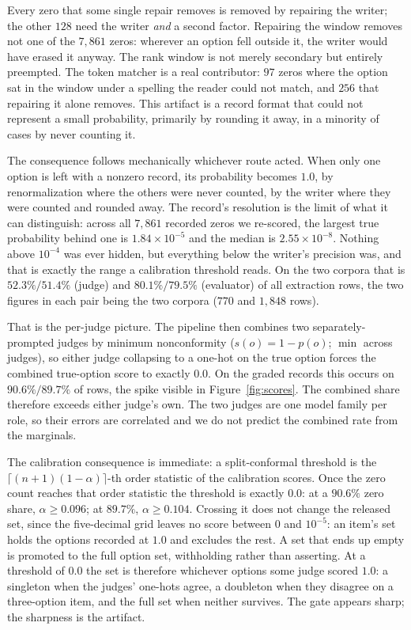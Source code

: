 \documentclass{article}
\newif\ifclaimtags\claimtagsfalse
\newcommand{\ct}[1]{\ifclaimtags\hfill{\scriptsize\textcolor{gray}{[#1]}}\fi}
\begin{document}
\noindent Every zero that some single repair removes is removed
by repairing the writer; the other $128$ need the writer \emph{and} a second
factor. Repairing the window removes not one of the $7{,}861$ zeros:
wherever an option fell outside it, the writer would have erased it anyway. The
rank window is not merely secondary but entirely preempted. The token matcher
is a real contributor: $97$
zeros where the option sat in the window under a spelling the reader could not
match, and $256$ that repairing it alone removes. This artifact is a record
format that could not represent a small probability, primarily by rounding it away, in a minority of cases by never counting it.\ct{C62, C69}

The consequence follows mechanically whichever route acted. When only one option is left
with a nonzero record, its probability becomes $1.0$, by renormalization where the others were never counted, by the writer where they were counted and rounded
away. The
record's resolution is the limit of what it can distinguish: across all $7{,}861$
recorded zeros we re-scored, the largest true probability behind one is
$1.84\times10^{-5}$ and the median is $2.55\times10^{-8}$. Nothing above $10^{-4}$ was ever hidden, but everything below the writer's precision was, and
that is exactly the range a calibration threshold reads.\ct{C67} On the two corpora that is
$52.3\%/51.4\%$ (judge) and $80.1\%/79.5\%$ (evaluator) of all extraction rows,
the two figures in each pair being the two corpora ($770$ and
$1{,}848$ rows).\ct{C1--C2, C62}

That is the per-judge picture. The pipeline then combines two separately-prompted
judges by minimum nonconformity ($s(o) = 1-p(o)$; $\min$ across judges), so
either judge collapsing to a one-hot on the true option forces the combined
true-option score to exactly $0.0$. On the graded records this occurs on $90.6\%/89.7\%$ of
rows, the spike visible in Figure~\ref{fig:scores}.\ct{C3} The combined share therefore exceeds either judge's own. The two judges are one model family per role, so their errors are correlated
and we do not predict the combined rate from the marginals.\ct{C52}

The calibration consequence is immediate: a split-conformal threshold is the
$\lceil(n{+}1)(1{-}\alpha)\rceil$-th order statistic of the calibration scores.
Once the zero count reaches that order statistic the threshold is exactly $0.0$: at a $90.6\%$ zero share, $\alpha \ge 0.096$; at $89.7\%$, $\alpha \ge
0.104$. Crossing it does not change the released set, since the five-decimal grid
leaves no score between $0$ and $10^{-5}$: an item's set holds
the options recorded at $1.0$ and excludes the rest.\ct{C4} A set that ends up empty is promoted to the full option set, withholding rather than asserting. At a threshold of $0.0$ the set is
therefore whichever options some judge scored $1.0$: a singleton when the judges'
one-hots agree, a doubleton when they disagree on a three-option item, and the
full set when neither survives.
The gate appears sharp; the sharpness is the artifact. 
\end{document}
